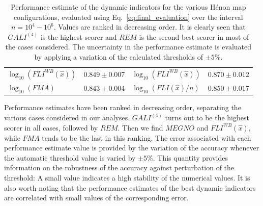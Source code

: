 \begin{table}[htb]
\begin{adjustbox}{width=\textwidth,center}
\begin{tabular}{lc|lc}
        $\log_{{10}}(FLI^{{WB}}(\hat{{x}}))$ & $0.849 \pm 0.007$ & $\log_{{10}}(FLI^{{WB}}(\hat{{x}}))$ & $0.870 \pm 0.012$ \\ 
        $\log_{{10}}(FMA)$ & $0.843 \pm 0.004$ & $\log_{{10}}(FLI(\hat{{x}})/n)$ & $0.850 \pm 0.017$ \\ 
        \hline
    \end{tabular}
    \end{adjustbox}
    \caption{Performance estimate of the dynamic indicators for the various Hénon map configurations, evaluated using Eq.~\eqref{eq:final_evaluation} over the interval $n=10^4-10^6$. Values are ranked in decreasing order. It is clearly seen that $GALI^{(4)}$ is the highest scorer and $REM$ is the second-best scorer in most of the cases considered. The uncertainty in the performance estimate is evaluated by applying a variation of the calculated thresholds of $\pm 5\%$.}
    \label{table:values}
\end{table}

Performance estimates have been ranked in decreasing order, separating the various cases considered in our analyses. $GALI^{(4)}$ turns out to be the highest scorer in all cases, followed by $REM$. Then we find $MEGNO$ and $FLI^{{WB}}(\hat{{x}})$, while $FMA$ tends to be the last in this ranking. The error associated with each performance estimate value is provided by the variation of the accuracy whenever the automatic threshold value is varied by $\pm 5\%$. This quantity provides information on the robustness of the accuracy against perturbation of the threshold: A small value indicates a high stability of the numerical values. It is also worth noting that the performance estimates of the best dynamic indicators are correlated with small values of the corresponding error.

